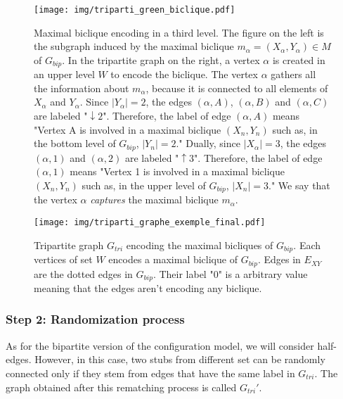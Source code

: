 \documentclass[table]{report}
\begin{document}

\begin{figure}[h]%
\centering
\texttt{[image: img/triparti\_green\_biclique.pdf]}
\caption{Maximal biclique encoding in a third level. The figure on the left is the subgraph induced by the maximal biclique $m_\alpha = (X_\alpha, Y_\alpha) \in M$  of $G_{bip}$. In the tripartite graph on the right, a vertex $\alpha$ is created in an upper level $W$ to encode the biclique. The vertex $\alpha$ gathers all the information about $m_\alpha$, because it is connected to all elements of $X_\alpha$ and $Y_\alpha$. Since $|Y_\alpha| =  2$, the edges $(\alpha,A)$, $(\alpha,B)$ and $(\alpha,C)$ are labeled "$\downarrow 2$". Therefore, the label of edge $(\alpha,A)$ means "Vertex A is involved in a maximal biclique $(X_n, Y_n)$ such as, in the bottom level of $G_{bip}$, $|Y_n| = 2$." Dually, since $|X_\alpha| =  3$, the edges $(\alpha,1)$ and $(\alpha,2)$ are labeled "$\uparrow 3$". Therefore, the label of edge $(\alpha,1)$ means "Vertex 1 is involved in a maximal biclique $(X_n, Y_n)$ such as, in the upper level of $G_{bip}$, $|X_n| = 3$." We say that the vertex $\alpha$ \textit{captures} the maximal biclique $m_\alpha$.}
\label{fig:directed_weighted_examples}
\end{figure}
\FloatBarrier


\begin{figure}[h]%
\centering
\texttt{[image: img/triparti\_graphe\_exemple\_final.pdf]}
\caption{Tripartite graph ${G_{tri}}$ encoding the maximal bicliques of $G_{bip}$. Each vertices of set $W$ encodes a maximal biclique of $G_{bip}$. Edges in $E_{XY}$ are the dotted edges in $G_{bip}$. Their label "0" is a arbitrary value meaning that the edges aren't encoding any biclique.}
\label{fig:triparti_graphe_exemple_final}
\end{figure}
\FloatBarrier

\subsubsection{Step 2: Randomization process}

As for the bipartite version of the configuration model, we will consider half-edges. However, in this case, two stubs from different set can be randomly connected only if they stem from edges that have the same label in ${G_{tri}}$. The graph obtained after this rematching process is called ${G_{tri}}'$.
\end{document}
